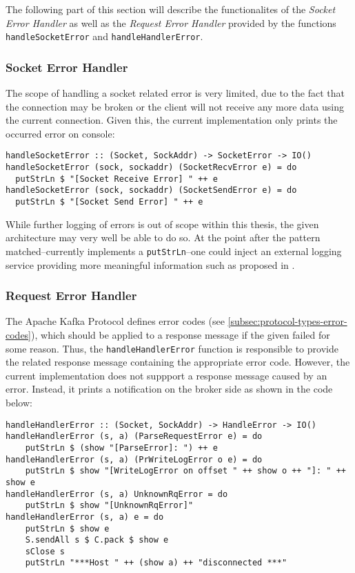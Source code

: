 The following part of this section will describe the functionalites of the
\textit{Socket Error Handler} as well as the \textit{Request Error Handler}
provided by the functions \lstinline{handleSocketError} and
\lstinline{handleHandlerError}.

\subsubsection{Socket Error Handler}

The scope of handling a socket related error is very limited, due to the fact
that the connection may be broken or the client will not receive any more data
using the current connection. Given this, the current implementation only
prints the occurred error on console:

\begin{lstlisting}[caption={Handling error of type SocketError}]
handleSocketError :: (Socket, SockAddr) -> SocketError -> IO()
handleSocketError (sock, sockaddr) (SocketRecvError e) = do
  putStrLn $ "[Socket Receive Error] " ++ e
handleSocketError (sock, sockaddr) (SocketSendError e) = do
  putStrLn $ "[Socket Send Error] " ++ e
\end{lstlisting}

While further logging of errors is out of scope within this thesis, the given
architecture may very well be able to do so. At the point after the pattern
matched--currently implements a \lstinline{putStrLn}--one
could inject an external logging service providing more meaningful information
such as proposed in .

\subsubsection{Request Error Handler}

The Apache Kafka Protocol defines error codes (see
\ref{subsec:protocol-types-error-codes}), which should be applied to a response
message if the given failed for some reason. Thus, the
\lstinline{handleHandlerError} function is responsible to provide the related
response message containing the appropriate error code. However, the current
implementation does not suppport a response message caused by an error. Instead,
it prints a notification on the broker side as shown in the code below:

\begin{lstlisting}[caption={Handling error of type HandleError}]
handleHandlerError :: (Socket, SockAddr) -> HandleError -> IO()
handleHandlerError (s, a) (ParseRequestError e) = do
    putStrLn $ (show "[ParseError]: ") ++ e
handleHandlerError (s, a) (PrWriteLogError o e) = do
    putStrLn $ show "[WriteLogError on offset " ++ show o ++ "]: " ++ show e
handleHandlerError (s, a) UnknownRqError = do
    putStrLn $ show "[UnknownRqError]"
handleHandlerError (s, a) e = do
    putStrLn $ show e
    S.sendAll s $ C.pack $ show e
    sClose s
    putStrLn "***Host " ++ (show a) ++ "disconnected ***"
\end{lstlisting}

